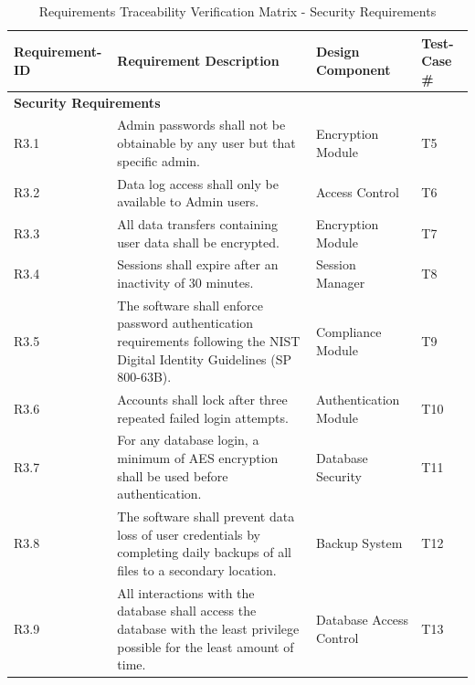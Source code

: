 \documentclass[letterpaper,12pt,oneside,listof=totoc]{scrreprt}
\begin{document}
\begin{table}[h]
\centering
\begin{tabularx}{\textwidth}{|l|X|X|l|}
\hline
\textbf{Requirement-ID} & \textbf{Requirement Description} & \textbf{Design Component} & \textbf{Test-Case \#} \\
\hline
\multicolumn{4}{|l|}{\textbf{Security Requirements}} \\
\hline
R3.1 & Admin passwords shall not be obtainable by any user but that specific admin. & Encryption Module & T5 \\
\hline
R3.2 & Data log access shall only be available to Admin users. & Access Control & T6 \\
\hline
R3.3 & All data transfers containing user data shall be encrypted. & Encryption Module & T7 \\
\hline
R3.4 & Sessions shall expire after an inactivity of 30 minutes. & Session Manager & T8 \\
\hline
R3.5 & The software shall enforce password authentication requirements following the NIST Digital Identity Guidelines (SP 800-63B). & Compliance Module & T9 \\
\hline
R3.6 & Accounts shall lock after three repeated failed login attempts. & Authentication Module & T10 \\
\hline
R3.7 & For any database login, a minimum of AES encryption shall be used before authentication. & Database Security & T11 \\
\hline
R3.8 & The software shall prevent data loss of user credentials by completing daily backups of all files to a secondary location. & Backup System & T12 \\
\hline
R3.9 & All interactions with the database shall access the database with the least privilege possible for the least amount of time. & Database Access Control & T13 \\
\hline
\end{tabularx}
\caption{Requirements Traceability Verification Matrix - Security Requirements}
\label{tab:RTVM2}
\end{table}
\end{document}
